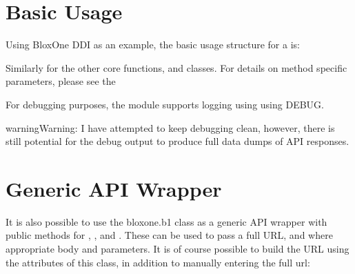 \documentclass[letterpaper,10pt,english]{sphinxmanual}
\begin{document}
\section{Basic Usage}
\label{\detokenize{usage:basic-usage}}
\sphinxAtStartPar
Using BloxOne DDI as an example, the basic usage structure for a  is:

\begin{sphinxVerbatim}[commandchars=\\\{\}]
 
   
   
   
\end{sphinxVerbatim}

\sphinxAtStartPar
Similarly for the other core functions, and classes. For details on method
specific parameters, please see the {\hyperref[\detokenize{classes::doc}]{}}

\sphinxAtStartPar
For debugging purposes, the  module supports logging using
 using DEBUG.

\begin{sphinxadmonition}{warning}{Warning:}
\sphinxAtStartPar
I have attempted to keep debugging clean, however, there is still potential
for the debug output to produce full data dumps of API responses.
\end{sphinxadmonition}


\section{Generic API Wrapper}
\label{\detokenize{usage:generic-api-wrapper}}
\sphinxAtStartPar
It is also possible to use the bloxone.b1 class as a generic API wrapper with public methods
for , ,  and . These can be used to pass a full URL, and where
appropriate body and parameters. It is of course possible to build the URL using the attributes
of this class, in addition to manually entering the full url:
\end{document}
